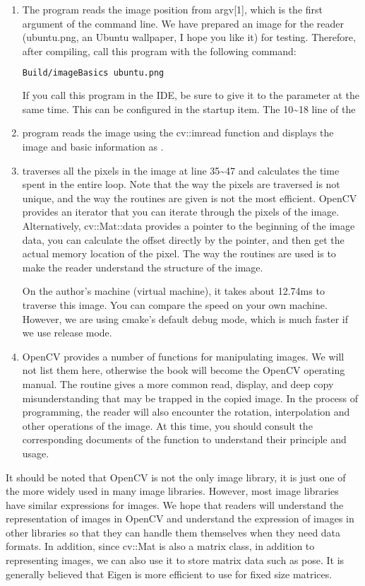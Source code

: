 \begin{enumerate}
	\item The program reads the image position from argv[1], which is the first argument of the command line. We have prepared an image for the reader (ubuntu.png, an Ubuntu wallpaper, I hope you like it) for testing. Therefore, after compiling, call this program with the following command:
	\begin{lstlisting}[language=sh,caption=terminal input:]
	Build/imageBasics ubuntu.png
	\end{lstlisting}
	If you call this program in the IDE, be sure to give it to the parameter at the same time. This can be configured in the startup item.
	The 10\textasciitilde18 line of the \item program reads the image using the cv::imread function and displays the image and basic information as \mbox{. }
	\item traverses all the pixels in the image at line 35\textasciitilde47 and calculates the time spent in the entire loop. Note that the way the pixels are traversed is not unique, and the way the routines are given is not the most efficient. OpenCV provides an iterator that you can iterate through the pixels of the image. Alternatively, cv::Mat::data provides a pointer to the beginning of the image data, you can calculate the offset directly by the pointer, and then get the actual memory location of the pixel. The way the routines are used is to make the reader understand the structure of the image.
	
	On the author's machine (virtual machine), it takes about 12.74ms to traverse this image. You can compare the speed on your own machine. However, we are using cmake's default debug mode, which is much faster if we use release mode.
	
	\item OpenCV provides a number of functions for manipulating images. We will not list them here, otherwise the book will become the OpenCV operating manual. The routine gives a more common read, display, and deep copy misunderstanding that may be trapped in the copied image. In the process of programming, the reader will also encounter the rotation, interpolation and other operations of the image. At this time, you should consult the corresponding documents of the function to understand their principle and usage.
\end{enumerate}

It should be noted that OpenCV is not the only image library, it is just one of the more widely used in many image libraries. However, most image libraries have similar expressions for images. We hope that readers will understand the representation of images in OpenCV and understand the expression of images in other libraries so that they can handle them themselves when they need data formats. In addition, since cv::Mat is also a matrix class, in addition to representing images, we can also use it to store matrix data such as pose. It is generally believed that Eigen is more efficient to use for fixed size matrices.


